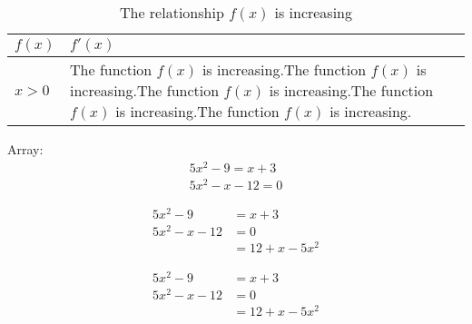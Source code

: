 \documentclass[11pt]{article}
\begin{document}
\begin{table}[H]
\centering
\def\arraystretch{1.5}
\begin{tabular}{|l||p{3in}|}
\hline
$f(x)$ & $f'(x)$\\ \hline
$x>0$ & The function $f(x)$ is increasing.The function $f(x)$ is increasing.The function $f(x)$ is increasing.The function $f(x)$ is increasing.The function $f(x)$ is increasing.\\ \hline
\end{tabular}
\caption{The relationship $f(x)$ is increasing}
\end{table}


Array:
\begin{align}
5x^2-9=x+3\\
5x^2-x-12=0
\end{align}

\begin{align}
5x^2-9&=x+3\\
5x^2-x-12&=0\\
&=12+x-5x^2
\end{align}


\begin{align*}
5x^2-9&=x+3\\
5x^2-x-12&=0\\
&=12+x-5x^2
\end{align*}
\end{document}
